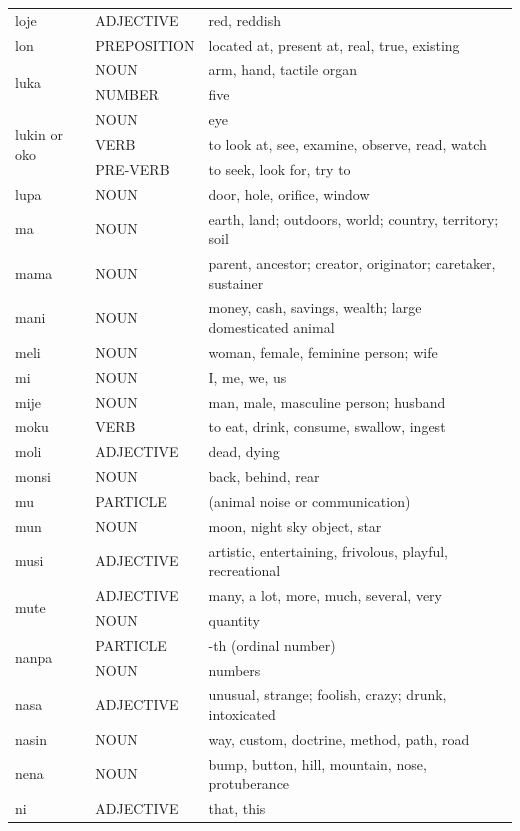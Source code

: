 \documentclass[14pt, a4paper]{extreport}
\begin{document}
\begin{longtable}{llp{10cm}}
  loje & ADJECTIVE & red, reddish \\
  lon & PREPOSITION & located at, present at, real, true, existing \\
  \multirow[t]{2}{*}{luka} & NOUN & arm, hand, tactile organ \\
  & NUMBER & five \\
  \multirow[t]{3}{*}{lukin or oko} & NOUN & eye \\
  & VERB & to look at, see, examine, observe, read, watch \\
  & PRE-VERB & to seek, look for, try to \\
  lupa & NOUN & door, hole, orifice, window \\
  ma & NOUN & earth, land; outdoors, world; country, territory; soil \\
  mama & NOUN & parent, ancestor; creator, originator; caretaker, sustainer \\
  mani & NOUN & money, cash, savings, wealth; large domesticated animal \\
  meli & NOUN & woman, female, feminine person; wife \\
  mi & NOUN & I, me, we, us \\
  mije & NOUN & man, male, masculine person; husband \\
  moku & VERB & to eat, drink, consume, swallow, ingest \\
  moli & ADJECTIVE & dead, dying \\
  monsi & NOUN & back, behind, rear \\
  mu & PARTICLE & (animal noise or communication) \\
  mun & NOUN & moon, night sky object, star \\
  musi & ADJECTIVE & artistic, entertaining, frivolous, playful, recreational \\
  \multirow[t]{2}{*}{mute} & ADJECTIVE & many, a lot, more, much, several, very \\
  & NOUN & quantity \\
  \multirow[t]{2}{*}{nanpa} & PARTICLE & -th (ordinal number) \\
  & NOUN & numbers \\
  nasa & ADJECTIVE & unusual, strange; foolish, crazy; drunk, intoxicated \\
  nasin & NOUN & way, custom, doctrine, method, path, road \\
  nena & NOUN & bump, button, hill, mountain, nose, protuberance \\
  ni & ADJECTIVE & that, this \\

\end{longtable}
\end{document}
